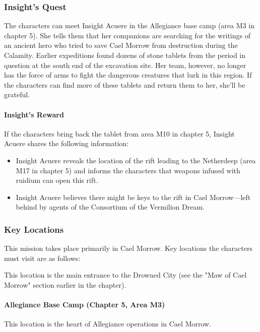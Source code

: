 \documentclass[10pt,a4paper,twoside,twocolumn,openany,nodeprecatedcode]{dndbook}
\begin{document}
\subsubsection{Insight's Quest}
The characters can meet Insight Acuere in the Allegiance base camp (area M3 in chapter 5). She tells them that her companions are searching for the writings of an ancient hero who tried to save Cael Morrow from destruction during the Calamity. Earlier expeditions found dozens of stone tablets from the period in question at the south end of the excavation site. Her team, however, no longer has the force of arms to fight the dangerous creatures that lurk in this region. If the characters can find more of these tablets and return them to her, she'll be grateful.

\paragraph{Insight's Reward}
If the characters bring back the tablet from area M10 in chapter 5, Insight Acuere shares the following information:


\begin{itemize}
\item Insight Acuere reveals the location of the rift leading to the Netherdeep (area M17 in chapter 5) and informs the characters that weapons infused with ruidium can open this rift.
\item Insight Acuere believes there might be keys to the rift in Cael Morrow—left behind by agents of the Consortium of the Vermilion Dream.
\end{itemize}

\subsubsection{Key Locations}
This mission takes place primarily in Cael Morrow. Key locations the characters must visit are as follows:


\begin{description}[nolistsep]
\item[Maw of Cael Morrow.]
This location is the main entrance to the Drowned City (see the "Maw of Cael Morrow" section earlier in the chapter).
\end{description}

\paragraph{Allegiance Base Camp (Chapter 5, Area M3)}
This location is the heart of Allegiance operations in Cael Morrow.
\end{document}

